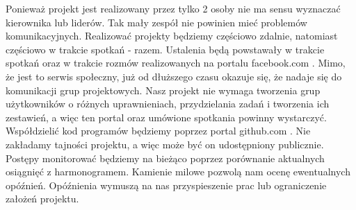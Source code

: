 Ponieważ projekt jest realizowany przez tylko 2 osoby nie ma sensu wyznaczać kierownika lub liderów. Tak mały zespół nie powinien mieć problemów komunikacyjnych. Realizować projekty będziemy częściowo zdalnie, natomiast częściowo w trakcie spotkań - razem. Ustalenia będą powstawały w trakcie spotkań oraz w trakcie rozmów realizowanych na portalu facebook.com . Mimo, że jest to serwis społeczny, już od dłuższego czasu okazuje się, że nadaje się do komunikacji grup projektowych. Nasz projekt nie wymaga tworzenia grup użytkowników o różnych uprawnieniach, przydzielania zadań i tworzenia ich zestawień, a więc ten portal oraz umówione spotkania powinny wystarczyć. \newline
Współdzielić kod programów będziemy poprzez portal github.com . Nie zakładamy tajności projektu, a więc może być on udostępniony publicznie. \newline
Postępy monitorować będziemy na bieżąco poprzez porównanie aktualnych osiągnięć z harmonogramem. Kamienie milowe pozwolą nam ocenę ewentualnych opóźnień. Opóźnienia wymuszą na nas przyspieszenie prac lub ograniczenie założeń projektu.
